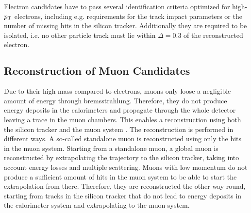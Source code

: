 \noindent Electron candidates have to pass several identification criteria optimized for high-$p_{\rm T}$ electrons, including e.g. requirements for the track impact parameters or the number of missing hits in the silicon tracker. Additionally they are required to be isolated, i.e. no other particle track must lie within $\Delta=0.3$ of the reconstructed electron.
\subsection{Reconstruction of Muon Candidates}
Due to their high mass compared to electrons, muons  only loose a negligible amount of energy through bremsstrahlung. Therefore, they do not produce energy deposits in the calorimeters and propagate through the whole detector leaving a trace in the muon chambers. This enables a reconstruction using both the silicon tracker and the muon system \cite{muonreco}. The reconstruction is performed in different ways. A so-called standalone muon is reconstructed using only the hits in the muon system. Starting from a standalone muon, a global muon is reconstructed by extrapolating the trajectory to the silicon tracker, taking into account energy losses and multiple scattering. Muons with low momentum do not produce a sufficient amount of hits in the muon system to be able to start the extrapolation from there. Therefore, they are reconstructed the other way round, starting from tracks in the silicon tracker that do not lead to energy deposits in the calorimeter system and extrapolating to the muon system.

